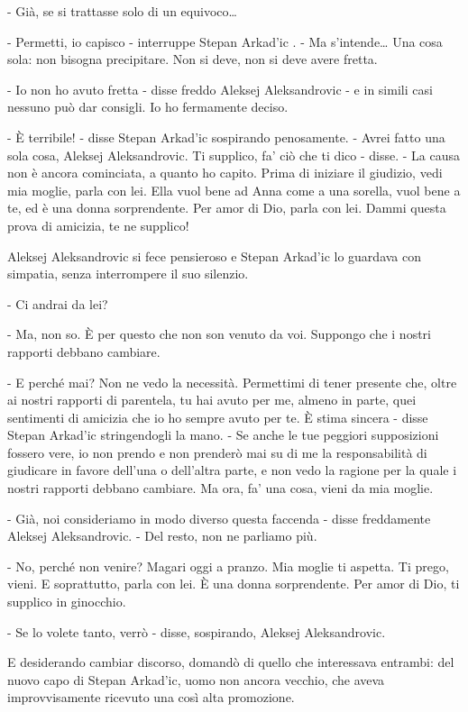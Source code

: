 - Già, se si trattasse solo di un equivoco\ldots{} 

- Permetti, io capisco - interruppe Stepan Arkad'ic . - Ma s'intende\ldots{} Una cosa sola: non bisogna precipitare. Non si deve, non si deve avere fretta. 

- Io non ho avuto fretta - disse freddo Aleksej Aleksandrovic - e in simili casi nessuno può dar consigli. Io ho fermamente deciso. 

- È terribile! - disse Stepan Arkad'ic sospirando penosamente. - Avrei fatto una sola cosa, Aleksej Aleksandrovic. Ti supplico, fa' ciò che ti dico - disse. - La causa non è ancora cominciata, a quanto ho capito. Prima di iniziare il giudizio, vedi mia moglie, parla con lei. Ella vuol bene ad Anna come a una sorella, vuol bene a te, ed è una donna sorprendente. Per amor di Dio, parla con lei. Dammi questa prova di amicizia, te ne supplico! 

Aleksej Aleksandrovic si fece pensieroso e Stepan Arkad'ic lo guardava con simpatia, senza interrompere il suo silenzio. 

- Ci andrai da lei? 

- Ma, non so. È per questo che non son venuto da voi. Suppongo che i nostri rapporti debbano cambiare. 

- E perché mai? Non ne vedo la necessità. Permettimi di tener presente che, oltre ai nostri rapporti di parentela, tu hai avuto per me, almeno in parte, quei sentimenti di amicizia che io ho sempre avuto per te. È stima sincera - disse Stepan Arkad'ic stringendogli la mano. - Se anche le tue peggiori supposizioni fossero vere, io non prendo e non prenderò mai su di me la responsabilità di giudicare in favore dell'una o dell'altra parte, e non vedo la ragione per la quale i nostri rapporti debbano cambiare. Ma ora, fa' una cosa, vieni da mia moglie. 

- Già, noi consideriamo in modo diverso questa faccenda - disse freddamente Aleksej Aleksandrovic. - Del resto, non ne parliamo più. 

- No, perché non venire? Magari oggi a pranzo. Mia moglie ti aspetta. Ti prego, vieni. E soprattutto, parla con lei. È una donna sorprendente. Per amor di Dio, ti supplico in ginocchio. 

- Se lo volete tanto, verrò - disse, sospirando, Aleksej Aleksandrovic. 

E desiderando cambiar discorso, domandò di quello che interessava entrambi: del nuovo capo di Stepan Arkad'ic, uomo non ancora vecchio, che aveva improvvisamente ricevuto una così alta promozione. 

